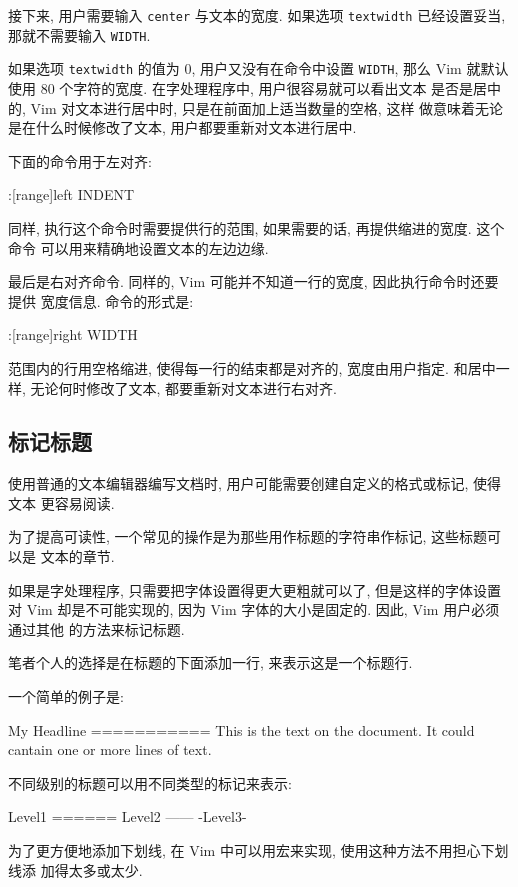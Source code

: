接下来, 用户需要输入 \texttt{center} 与文本的宽度. 如果选项 \texttt{textwidth}
已经设置妥当, 那就不需要输入 \texttt{WIDTH}.

如果选项 \texttt{textwidth} 的值为 0, 用户又没有在命令中设置 \texttt{WIDTH},
那么 Vim 就默认使用 80 个字符的宽度. 在字处理程序中, 用户很容易就可以看出文本
是否是居中的, Vim 对文本进行居中时, 只是在前面加上适当数量的空格, 这样
做意味着无论是在什么时候修改了文本, 用户都要重新对文本进行居中.

下面的命令用于左对齐:
\begin{vimcode}
:[range]left INDENT
\end{vimcode}
同样, 执行这个命令时需要提供行的范围, 如果需要的话, 再提供缩进的宽度. 这个命令
可以用来精确地设置文本的左边边缘.

最后是右对齐命令. 同样的, Vim 可能并不知道一行的宽度, 因此执行命令时还要提供
宽度信息. 命令的形式是:
\begin{vimcode}
:[range]right WIDTH
\end{vimcode}
范围内的行用空格缩进, 使得每一行的结束都是对齐的, 宽度由用户指定. 和居中一样,
无论何时修改了文本, 都要重新对文本进行右对齐.

\subsection{标记标题}
\label{subsec:marking_headlines}

使用普通的文本编辑器编写文档时, 用户可能需要创建自定义的格式或标记, 使得文本
更容易阅读.

为了提高可读性, 一个常见的操作是为那些用作标题的字符串作标记, 这些标题可以是
文本的章节.

如果是字处理程序, 只需要把字体设置得更大更粗就可以了, 但是这样的字体设置对
Vim 却是不可能实现的, 因为 Vim 字体的大小是固定的. 因此, Vim 用户必须通过其他
的方法来标记标题.

笔者个人的选择是在标题的下面添加一行, 来表示这是一个标题行.

一个简单的例子是:
\begin{vimcode}
My Headline
===========
This is the text on the document. It could cantain one
or more lines of text.
\end{vimcode}
不同级别的标题可以用不同类型的标记来表示:
\begin{vimcode}
Level1
======
Level2
------
-Level3-
\end{vimcode}

为了更方便地添加下划线, 在 Vim 中可以用宏来实现, 使用这种方法不用担心下划线添
加得太多或太少.

